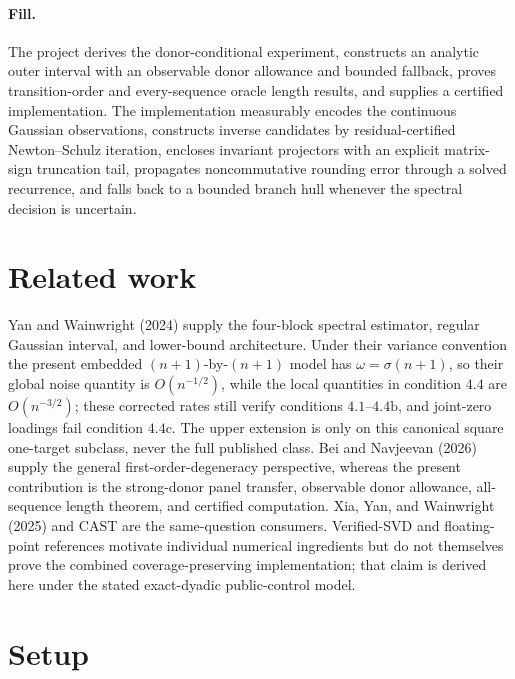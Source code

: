 \documentclass{article}
\begin{document}
\paragraph{Fill.} The project derives the donor-conditional experiment, constructs an analytic outer interval with an observable donor allowance and bounded fallback, proves transition-order and every-sequence oracle length results, and supplies a certified implementation. The implementation measurably encodes the continuous Gaussian observations, constructs inverse candidates by residual-certified Newton--Schulz iteration, encloses invariant projectors with an explicit matrix-sign truncation tail, propagates noncommutative rounding error through a solved recurrence, and falls back to a bounded branch hull whenever the spectral decision is uncertain.

\section{Related work}

Yan and Wainwright (2024) supply the four-block spectral estimator, regular Gaussian interval, and lower-bound architecture. Under their variance convention the present embedded \((n+1)\)-by-\((n+1)\) model has \(\omega=\sigma(n+1)\), so their global noise quantity is \(O(n^{-1/2})\), while the local quantities in condition \(4.4\) are \(O(n^{-3/2})\); these corrected rates still verify conditions \(4.1\)--\(4.4\mathrm b\), and joint-zero loadings fail condition \(4.4\mathrm c\). The upper extension is only on this canonical square one-target subclass, never the full published class. Bei and Navjeevan (2026) supply the general first-order-degeneracy perspective, whereas the present contribution is the strong-donor panel transfer, observable donor allowance, all-sequence length theorem, and certified computation. Xia, Yan, and Wainwright (2025) and CAST are the same-question consumers. Verified-SVD and floating-point references motivate individual numerical ingredients but do not themselves prove the combined coverage-preserving implementation; that claim is derived here under the stated exact-dyadic public-control model.

\section{Setup}
\end{document}

